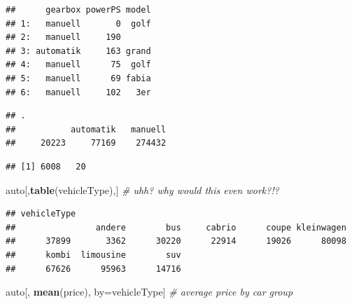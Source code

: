 \documentclass[]{book}
\newenvironment{Shaded}{\begin{snugshade}}{\end{snugshade}}
\newcommand{\CommentTok}[1]{\textcolor[rgb]{0.56,0.35,0.01}{\textit{#1}}}
\newcommand{\KeywordTok}[1]{\textcolor[rgb]{0.13,0.29,0.53}{\textbf{#1}}}
\newcommand{\NormalTok}[1]{#1}
\newcommand{\OperatorTok}[1]{\textcolor[rgb]{0.81,0.36,0.00}{\textbf{#1}}}
\newcommand{\StringTok}[1]{\textcolor[rgb]{0.31,0.60,0.02}{#1}}
\theoremstyle{definition}
\theoremstyle{definition}
\theoremstyle{definition}
\theoremstyle{remark}
\begin{document}
\begin{verbatim}
##      gearbox powerPS model
## 1:   manuell       0  golf
## 2:   manuell     190      
## 3: automatik     163 grand
## 4:   manuell      75  golf
## 5:   manuell      69 fabia
## 6:   manuell     102   3er
\end{verbatim}

\begin{Shaded}
\end{Shaded}

\begin{verbatim}
## .
##           automatik   manuell 
##     20223     77169    274432
\end{verbatim}

\begin{Shaded}
\end{Shaded}

\begin{verbatim}
## [1] 6008   20
\end{verbatim}

\begin{Shaded}
\begin{Highlighting}[]
\NormalTok{auto[,}\KeywordTok{table}\NormalTok{(vehicleType),] }\CommentTok{# uhh? why would this even work?!?}
\end{Highlighting}
\end{Shaded}

\begin{verbatim}
## vehicleType
##                andere        bus     cabrio      coupe kleinwagen 
##      37899       3362      30220      22914      19026      80098 
##      kombi  limousine        suv 
##      67626      95963      14716
\end{verbatim}

\begin{Shaded}
\begin{Highlighting}[]
\NormalTok{auto[, }\KeywordTok{mean}\NormalTok{(price), by=vehicleType] }\CommentTok{# average price by car group}
\end{Highlighting}
\end{Shaded}
\end{document}
